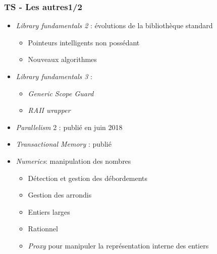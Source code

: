 \documentclass[C++.tex]{subfiles}
\begin{document}
\begin{frame}
	\frametitle{TS - Les autres\titlehfill{}1/2}
	\begin{itemize}
		\item \textit{Library fundamentals 2} : évolutions de la bibliothèque standard
		\begin{itemize}


			\item Pointeurs intelligents non possédant
			\item Nouveaux algorithmes

		\end{itemize}
		\item \textit{Library fundamentals 3} :
		\begin{itemize}
			\item \textit{Generic Scope Guard}
			\item \textit{RAII wrapper}
		\end{itemize}
	
		\item \textit{Parallelism} 2 : publié en juin 2018
		\item \textit{Transactional Memory} : publié
		\item \textit{Numerics}: manipulation des nombres
		\begin{itemize}
			\item Détection et gestion des débordements
			\item Gestion des arrondis
			\item Entiers larges
			\item Rationnel
			\item \textit{Proxy} pour manipuler la représentation interne des entiers
		\end{itemize}
	
	\end{itemize}
\end{frame}
\end{document}
